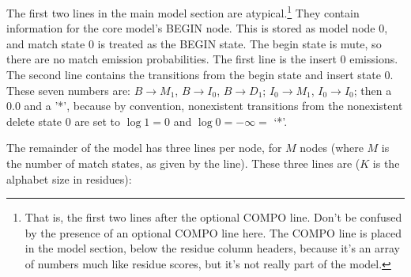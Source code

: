 The first two lines in the main model section are
atypical.\footnote{That is, the first two lines after the optional
  COMPO line. Don't be confused by the presence of an optional COMPO
  line here. The COMPO line is placed in the model section, below the
  residue column headers, because it's an array of numbers much like
  residue scores, but it's not really part of the model.}  They
contain information for the core model's BEGIN node. This is stored as
model node 0, and match state 0 is treated as the BEGIN state.  The
begin state is mute, so there are no match emission probabilities. The
first line is the insert 0 emissions. The second line contains the
transitions from the begin state and insert state 0.  These seven
numbers are: $B \rightarrow M_1$, $B \rightarrow I_0$, $B \rightarrow
D_1$; $I_0 \rightarrow M_1$, $I_0 \rightarrow I_0$; then a 0.0 and a
'*', because by convention, nonexistent transitions from the
nonexistent delete state 0 are set to $\log 1 = 0$ and $\log 0 =
-\infty = $ `*'.

The remainder of the model has three lines per node, for $M$ nodes
(where $M$ is the number of match states, as given by the 
line). These three lines are ($K$ is the alphabet size in residues):

